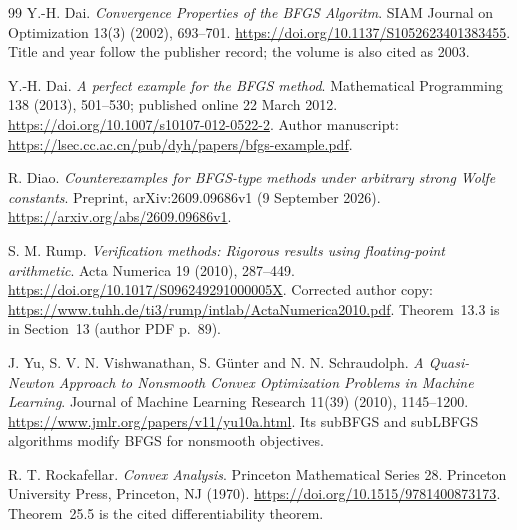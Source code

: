 \begin{thebibliography}{99}
Y.-H. Dai. \emph{Convergence Properties of the BFGS Algoritm}. SIAM Journal on Optimization 13(3) (2002), 693--701. \url{https://doi.org/10.1137/S1052623401383455}. Title and year follow the publisher record; the volume is also cited as 2003.

Y.-H. Dai. \emph{A perfect example for the BFGS method}. Mathematical Programming 138 (2013), 501--530; published online 22 March 2012. \url{https://doi.org/10.1007/s10107-012-0522-2}. Author manuscript: \url{https://lsec.cc.ac.cn/pub/dyh/papers/bfgs-example.pdf}.

R. Diao. \emph{Counterexamples for BFGS-type methods under arbitrary strong Wolfe constants}. Preprint, arXiv:2609.09686v1 (9 September 2026). \url{https://arxiv.org/abs/2609.09686v1}.

S. M. Rump. \emph{Verification methods: Rigorous results using floating-point arithmetic}. Acta Numerica 19 (2010), 287--449. \url{https://doi.org/10.1017/S096249291000005X}. Corrected author copy: \url{https://www.tuhh.de/ti3/rump/intlab/ActaNumerica2010.pdf}. Theorem~13.3 is in Section~13 (author PDF p.~89).

J. Yu, S. V. N. Vishwanathan, S. G\"unter and N. N. Schraudolph. \emph{A Quasi-Newton Approach to Nonsmooth Convex Optimization Problems in Machine Learning}. Journal of Machine Learning Research 11(39) (2010), 1145--1200. \url{https://www.jmlr.org/papers/v11/yu10a.html}. Its subBFGS and subLBFGS algorithms modify BFGS for nonsmooth objectives.

R. T. Rockafellar. \emph{Convex Analysis}. Princeton Mathematical Series 28. Princeton University Press, Princeton, NJ (1970). \url{https://doi.org/10.1515/9781400873173}.
 Theorem~25.5 is the cited differentiability theorem.

\end{thebibliography}
